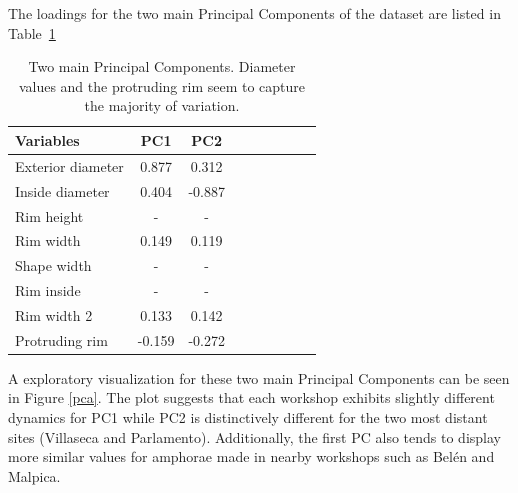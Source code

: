\documentclass[review]{elsarticle}
\begin{document}
The loadings for the two main Principal Components of the dataset are listed in Table~\ref{table:pca}

\begin{table}[htp]
\centering
\begin{tabular}{lcccccccc}
\hline
Variables & PC1 & PC2 \\ \hline
Exterior diameter & 0.877 & 0.312 \\
Inside diameter & 0.404 & -0.887 \\
Rim height & - & - \\
Rim width & 0.149 & 0.119 \\
Shape width & - & - \\
Rim inside & - & - \\
Rim width 2 & 0.133 & 0.142 \\
Protruding rim & -0.159 & -0.272 \\
\hline
\end{tabular}
\caption{Two main Principal Components. Diameter values and the protruding rim seem to capture the majority of variation.}
\label{table:pca}
\end{table}

A exploratory visualization for these two main Principal Components can be seen in Figure \ref{pca}. The plot suggests that each workshop exhibits slightly different dynamics for PC1 while PC2 is distinctively different for the two most distant sites (Villaseca and Parlamento). Additionally, the first PC also tends to display more similar values for amphorae made in nearby workshops such as Bel\'en and Malpica. 
\end{document}
